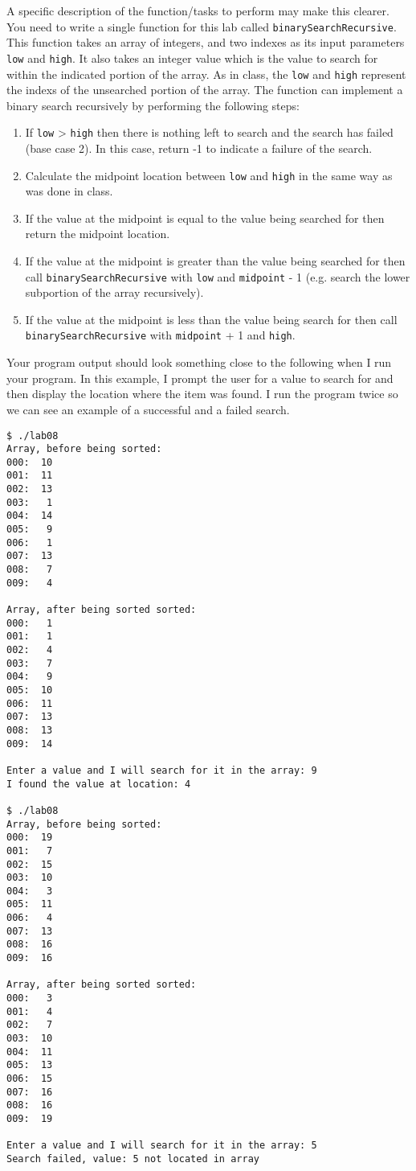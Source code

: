 \documentclass[11pt]{article}
\begin{document}
A specific description of the function/tasks to perform may make this
clearer.  You need to write a single function for this lab called
\verb~binarySearchRecursive~.  This function takes an array of integers,
and two indexes as its input parameters \verb~low~ and \verb~high~.  It also
takes an integer value which is the value to search for within the
indicated portion of the array.  As in class, the \verb~low~ and \verb~high~
represent the indexs of the unsearched portion of the array.  The
function can implement a binary search recursively by performing the
following steps:

\begin{enumerate}
\item If \verb~low~ > \verb~high~ then there is nothing left to search and the
   search has failed (base case 2).  In this case, return -1 to
   indicate a failure of the search.
\item Calculate the midpoint location between \verb~low~ and \verb~high~ in the
   same way as was done in class.
\item If the value at the midpoint is equal to the value being searched for
   then return the midpoint location.
\item If the value at the midpoint is greater than the value being searched for
   then call \verb~binarySearchRecursive~ with \verb~low~ and \verb~midpoint~ - 1 (e.g. 
   search the lower subportion of the array recursively).
\item If the value at the midpoint is less than the value being search for 
   then call \verb~binarySearchRecursive~ with \verb~midpoint~ + 1 and \verb~high~.
\end{enumerate}

Your program output should look something close to the following when
I run your program.  In this example, I prompt the user for a value to
search for and then display the location where the item was found.  I
run the program twice so we can see an example of a successful and a
failed search.


\begin{verbatim}
$ ./lab08
Array, before being sorted:
000:  10
001:  11
002:  13
003:   1
004:  14
005:   9
006:   1
007:  13
008:   7
009:   4

Array, after being sorted sorted:
000:   1
001:   1
002:   4
003:   7
004:   9
005:  10
006:  11
007:  13
008:  13
009:  14

Enter a value and I will search for it in the array: 9
I found the value at location: 4

$ ./lab08
Array, before being sorted:
000:  19
001:   7
002:  15
003:  10
004:   3
005:  11
006:   4
007:  13
008:  16
009:  16

Array, after being sorted sorted:
000:   3
001:   4
002:   7
003:  10
004:  11
005:  13
006:  15
007:  16
008:  16
009:  19

Enter a value and I will search for it in the array: 5
Search failed, value: 5 not located in array
\end{verbatim}
\end{document}

